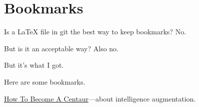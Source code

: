 \chapter{Bookmarks}

Is a LaTeX file in git the best way to keep bookmarks? No.

But is it an acceptable way? Also no.

But it's what I got.

Here are some bookmarks.

\begin{itemize}
\href{https://jods.mitpress.mit.edu/pub/issue3-case}{How To Become A Centaur}---about intelligence augmentation.
\end{itemize}
